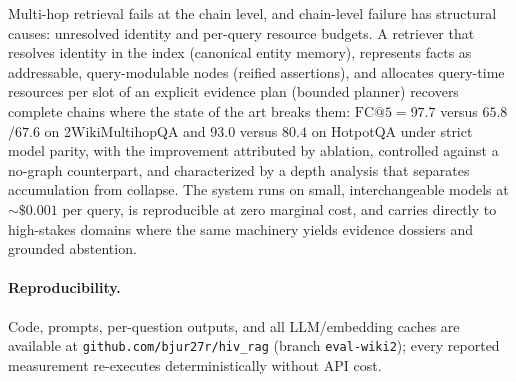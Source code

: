 \documentclass[11pt,a4paper]{article}
\begin{document}
Multi-hop retrieval fails at the chain level, and chain-level failure has
structural causes: unresolved identity and per-query resource budgets. A
retriever that resolves identity in the index (canonical entity memory),
represents facts as addressable, query-modulable nodes (reified assertions),
and allocates query-time resources per slot of an explicit evidence plan
(bounded planner) recovers complete chains where the state of the art breaks
them: $\mathrm{FC@}5=97.7$ versus $65.8$/$67.6$ on 2WikiMultihopQA and
$93.0$ versus $80.4$ on HotpotQA under strict model parity, with the
improvement attributed by ablation, controlled against a no-graph
counterpart, and characterized by a depth analysis that separates
accumulation from collapse. The system runs on small, interchangeable
models at ${\sim}\$0.001$ per query, is reproducible at zero marginal cost,
and carries directly to high-stakes domains where the same machinery yields
evidence dossiers and grounded abstention.

\paragraph{Reproducibility.} Code, prompts, per-question outputs, and all
LLM/embedding caches are available at
\texttt{github.com/bjur27r/hiv\_rag} (branch \texttt{eval-wiki2}); every
reported measurement re-executes deterministically without API cost.
\end{document}

